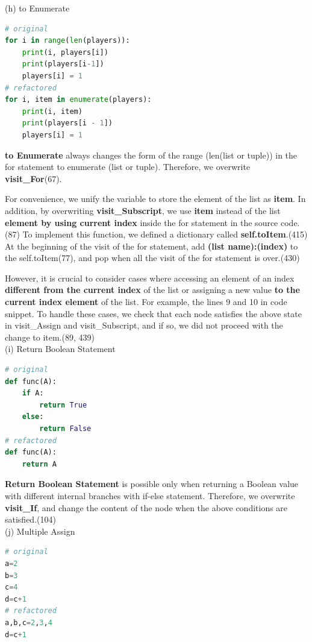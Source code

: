 \documentclass[11pt]{article}
\begin{document}
(h) to Enumerate
\begin{lstlisting}[language=python]
# original
for i in range(len(players)):
    print(i, players[i])
    print(players[i-1])
    players[i] = 1
# refactored
for i, item in enumerate(players):
    print(i, item)
    print(players[i - 1])
    players[i] = 1
\end{lstlisting}

\textbf{to Enumerate} always changes the form of the range (len(list or tuple)) in the for statement to enumerate (list or tuple). Therefore, we overwrite \textbf{visit\_For}(67).

For convenience, we unify the variable to store the element of the list as \textbf{item}. In addition, by overwriting \textbf{visit\_Subscript}, we use \textbf{item} instead of the list \textbf{element by using current index} inside the for statement in the source code.(87) To implement this function, we defined a dictionary called \textbf{self.toItem}.(415) At the beginning of the visit of the for statement, add \textbf{(list name):(index)} to the self.toItem(77), and pop when all the visit of the for statement is over.(430)

However, it is crucial to consider cases where accessing an element of an index \textbf{different from the current index} of the list or assigning a new value \textbf{to the current index element} of the list. For example, the lines 9 and 10 in code snippet. To handle these cases, we check that each node satisfies the above state in visit\_Assign and visit\_Subscript, and if so, we did not proceed with the change to item.(89, 439)\\

(i) Return Boolean Statement
\begin{lstlisting}[language=python]
# original
def func(A):
    if A:
        return True
    else:
        return False
# refactored
def func(A):
    return A
\end{lstlisting}

\textbf{Return Boolean Statement} is possible only when returning a Boolean value with different internal branches with if-else statement. Therefore, we overwrite \textbf{visit\_If}, and change the content of the node when the above conditions are satisfied.(104) \\

(j) Multiple Assign
\begin{lstlisting}[language=python]
# original
a=2
b=3
c=4
d=c+1
# refactored
a,b,c=2,3,4
d=c+1
\end{lstlisting}
\end{document}
